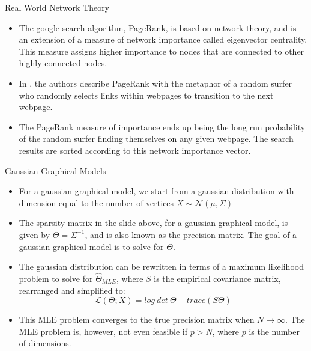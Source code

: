 \documentclass{beamer}
\begin{document}
\begin{frame}{Real World Network Theory \cite{page1999pagerank}}
	\begin{itemize}
		\item The google search algorithm, PageRank, is based on network theory, and is an extension of a measure of network importance called eigenvector centrality. This measure assigns higher importance to nodes that are connected to other highly connected nodes.
		\item In \cite{page1999pagerank}, the authors describe PageRank with the metaphor of a random surfer who randomly selects links within webpages to transition to the next webpage.
		\item The PageRank measure of importance ends up being the long run probability of the random surfer finding themselves on any given webpage. The search results are sorted according to this network importance vector.
	\end{itemize}
\end{frame}

\begin{frame}{Gaussian Graphical Models}
  \begin{itemize}
    \item For a gaussian graphical model, we start from a gaussian distribution with dimension equal to the number of vertices $X \sim \mathcal{N}(\mu, \Sigma)$
    \item The sparsity matrix in the slide above, for a gaussian graphical model, is given by $\Theta = \Sigma^{-1}$, and is also known as the precision matrix. The goal of a gaussian graphical model is to solve for $\Theta$.
    \item The gaussian distribution can be rewritten in terms of a maximum likelihood problem to solve for $\hat{\Theta}_{MLE}$, where $S$ is the empirical covariance matrix, rearranged and simplified to:
    \[\mathcal{L}(\Theta; X) = log \ det \ \Theta - trace(S \Theta)\]
    \item This MLE problem converges to the true precision matrix when $N \xrightarrow{} \infty$. The MLE problem is, however, not even feasible if $p > N$, where $p$ is the number of dimensions.
  \end{itemize}
\end{frame}
\end{document}
